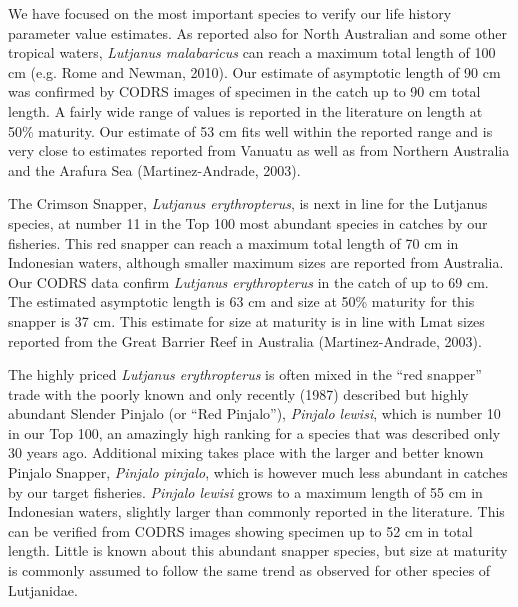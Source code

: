 We have focused on the most important species to verify our life history parameter value estimates. As reported also for North Australian and some other tropical waters, \textit{Lutjanus malabaricus} can reach a maximum total length of 100 cm (e.g. Rome and Newman, 2010). Our estimate of asymptotic length of 90 cm was confirmed by CODRS images of specimen in the catch up to 90 cm total length. A fairly wide range of values is reported in the literature on length at 50\% maturity. Our estimate of 53 cm fits well within the reported range and is very close to estimates reported from Vanuatu as well as from Northern Australia and the Arafura Sea (Martinez-Andrade, 2003).

The Crimson Snapper, \textit{Lutjanus erythropterus}, is next in line for the Lutjanus species, at number 11 in the Top 100 most abundant species in catches by our fisheries. This red snapper can reach a maximum total length of 70 cm in Indonesian waters, although smaller maximum sizes are reported from Australia. Our CODRS data confirm \textit{Lutjanus erythropterus} in the catch of up to 69 cm. The estimated asymptotic length is 63 cm and size at 50\% maturity for this snapper is 37 cm. This estimate for size at maturity is in line with Lmat sizes reported from the Great Barrier Reef in Australia (Martinez-Andrade, 2003).

The highly priced \textit{Lutjanus erythropterus} is often mixed in the ``red snapper'' trade with the poorly known and only recently (1987) described but highly abundant Slender Pinjalo (or ``Red Pinjalo''), \textit{Pinjalo lewisi}, which is number 10 in our Top 100, an amazingly high ranking for a species that was described only 30 years ago. Additional mixing takes place with the larger and better known Pinjalo Snapper, \textit{Pinjalo pinjalo}, which is however much less abundant in catches by our target fisheries. \textit{Pinjalo lewisi} grows to a maximum length of 55 cm in Indonesian waters, slightly larger than commonly reported in the literature. This can be verified from CODRS images showing specimen up to 52 cm in total length. Little is known about this abundant snapper species, but size at maturity is commonly assumed to follow the same trend as observed for other species of Lutjanidae.

